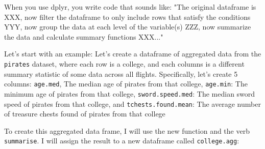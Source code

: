 \documentclass{tufte-book}\usepackage[]{graphicx}\usepackage[]{color}
\makeatletter
\newcommand{\hlcom}[1]{\textcolor[rgb]{0.678,0.584,0.686}{\textit{#1}}}%
\newcommand{\hlopt}[1]{\textcolor[rgb]{0,0,0}{#1}}%
\newcommand{\hlstd}[1]{\textcolor[rgb]{0.345,0.345,0.345}{#1}}%
\newcommand{\hlkwb}[1]{\textcolor[rgb]{0.69,0.353,0.396}{#1}}%
\newcommand{\hlkwc}[1]{\textcolor[rgb]{0.333,0.667,0.333}{#1}}%
\newcommand{\hlkwd}[1]{\textcolor[rgb]{0.737,0.353,0.396}{\textbf{#1}}}%
\newenvironment{kframe}{%
 \def\at@end@of@kframe{}%
 \ifinner\ifhmode%
  \def\at@end@of@kframe{\end{minipage}}%
  \begin{minipage}{\columnwidth}%
 \fi\fi%
 \def\FrameCommand##1{\hskip\@totalleftmargin \hskip-\fboxsep
 \colorbox{shadecolor}{##1}\hskip-\fboxsep
     \hskip-\linewidth \hskip-\@totalleftmargin \hskip\columnwidth}%
 \MakeFramed {\advance\hsize-\width
   \@totalleftmargin\z@ \linewidth\hsize
   \@setminipage}}%
 {\par\unskip\endMakeFramed%
 \at@end@of@kframe}
\newenvironment{knitrout}{}{} %
\makeatother
\begin{document}
\begin{footnotesize}
When you use dplyr, you write code that sounds like: "The original dataframe is XXX, now filter the dataframe to only include rows that satisfy the conditions YYY, now group the data at each level of the variable(s) ZZZ, now summarize the data and calculate summary functions XXX..."


Let's start with an example: Let's create a dataframe of aggregated data from the \texttt{pirates} dataset, where each row is a college, and each columns is a different summary statistic of some data across all flights. Specifically, let's create 5 columns: \texttt{age.med}, The median age of pirates from that college, \texttt{age.min}: The minimum age of pirates from that college, \texttt{sword.speed.med}: The median sword speed of pirates from that college, and \texttt{tchests.found.mean}: The average number of treasure chests found of pirates from that college

To create this aggregated data frame, I will use the new function  and the verb \texttt{summarise}. I will assign the result to a new dataframe called \texttt{college.agg}:



\end{footnotesize}
\end{document}
